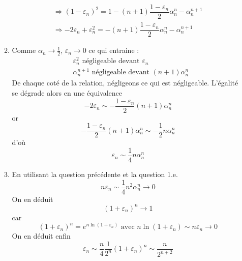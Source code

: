 \begin{enumerate}
\begin{enumerate}
\begin{multline*}
\Rightarrow (1-\varepsilon_n)^2 = 1 -(n+1)\dfrac{1-\varepsilon_n}{2}\alpha_n^n -\alpha_n^{n+1} \\
\Rightarrow -2\varepsilon_n +\varepsilon_n^2 =  -(n+1)\dfrac{1-\varepsilon_n}{2}\alpha_n^n -\alpha_n^{n+1}
\end{multline*}
\item Comme $\alpha_n \rightarrow \frac{1}{2}$, $\varepsilon_n \rightarrow 0$ ce qui entraine :
\begin{align*}
 & \varepsilon_n^2 \text{ négligeable devant } \varepsilon_n \\
 & \alpha_n^{n+1}  \text{ négligeable devant } (n+1)\alpha_n^n
\end{align*}
De chaque coté de la relation, négligeons ce qui est négligeable. L'égalité se dégrade alors en une équivalence
\begin{displaymath}
 -2\varepsilon_n \sim -\dfrac{1-\varepsilon_n}{2}(n+1)\alpha_n^n
\end{displaymath}
or
\begin{displaymath}
 -\dfrac{1-\varepsilon_n}{2}(n+1)\alpha_n^n \sim -\dfrac{1}{2}n\alpha_n^n
\end{displaymath}
d'où
\begin{displaymath}
 \varepsilon_n \sim \dfrac{1}{4}n\alpha_n^n
\end{displaymath}
\item En utilisant la question précédente et la question 1.e.
\begin{displaymath}
 n\varepsilon_n \sim \dfrac{1}{4}n^2\alpha_n^n \rightarrow 0
\end{displaymath}
On en déduit 
\begin{displaymath}
 (1+\varepsilon_n)^n \rightarrow 1
\end{displaymath}
car
\begin{displaymath}
 (1+\varepsilon_n)^n = e^{n\ln(1+\varepsilon_n)} \text{ avec }
n\ln(1+\varepsilon_n) \sim n\varepsilon_n \rightarrow 0
\end{displaymath}
On en déduit enfin
\begin{displaymath}
 \varepsilon_n \sim \dfrac{n}{4}\dfrac{1}{2^n}(1+\varepsilon_n)^n \sim \dfrac{n}{2^{n+2}}
\end{displaymath}

\end{enumerate}
\end{enumerate}
